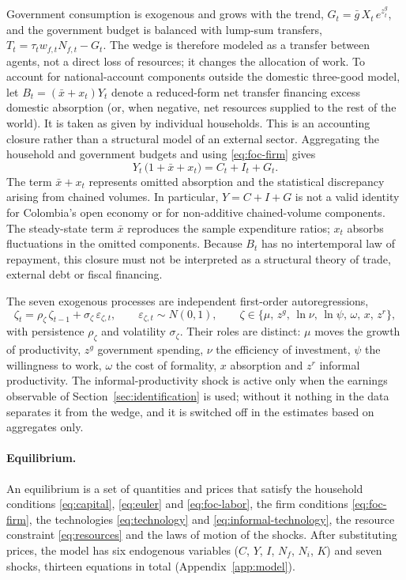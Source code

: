 Government consumption is exogenous and grows with the trend, $G_t = \bar g\,X_t\,e^{z^g_t}$, and the government budget is balanced with lump-sum transfers, $T_t = \tau_tw_{f,t}N_{f,t} - G_t$. The wedge is therefore modeled as a transfer between agents, not a direct loss of resources; it changes the allocation of work. To account for national-account components outside the domestic three-good model, let $B_t=(\bar x+x_t)Y_t$ denote a reduced-form net transfer financing excess domestic absorption (or, when negative, net resources supplied to the rest of the world). It is taken as given by individual households. This is an accounting closure rather than a structural model of an external sector. Aggregating the household and government budgets and using \eqref{eq:foc-firm} gives
\begin{equation}
Y_t\,\big(1 + \bar x + x_t\big) = C_t + I_t + G_t .
\label{eq:resources}
\end{equation}
The term $\bar x+x_t$ represents omitted absorption and the statistical discrepancy arising from chained volumes. In particular, $Y=C+I+G$ is not a valid identity for Colombia's open economy or for non-additive chained-volume components. The steady-state term $\bar x$ reproduces the sample expenditure ratios; $x_t$ absorbs fluctuations in the omitted components. Because $B_t$ has no intertemporal law of repayment, this closure must not be interpreted as a structural theory of trade, external debt or fiscal financing.

The seven exogenous processes are independent first-order autoregressions,
\begin{equation}
\zeta_t = \rho_\zeta\,\zeta_{t-1} + \sigma_\zeta\,\varepsilon_{\zeta,t},\qquad \varepsilon_{\zeta,t}\sim N(0,1),\qquad \zeta\in\{\mu,\, z^g,\, \ln\nu,\, \ln\psi,\, \omega,\, x,\, z^r\},
\label{eq:shocks}
\end{equation}
with persistence $\rho_\zeta$ and volatility $\sigma_\zeta$. Their roles are distinct: $\mu$ moves the growth of productivity, $z^g$ government spending, $\nu$ the efficiency of investment, $\psi$ the willingness to work, $\omega$ the cost of formality, $x$ absorption and $z^r$ informal productivity. The informal-productivity shock is active only when the earnings observable of Section~\ref{sec:identification} is used; without it nothing in the data separates it from the wedge, and it is switched off in the estimates based on aggregates only.

\paragraph{Equilibrium.} An equilibrium is a set of quantities and prices that satisfy the household conditions \eqref{eq:capital}, \eqref{eq:euler} and \eqref{eq:foc-labor}, the firm conditions \eqref{eq:foc-firm}, the technologies \eqref{eq:technology} and \eqref{eq:informal-technology}, the resource constraint \eqref{eq:resources} and the laws of motion of the shocks. After substituting prices, the model has six endogenous variables ($C$, $Y$, $I$, $N_f$, $N_i$, $K$) and seven shocks, thirteen equations in total (Appendix~\ref{app:model}).

